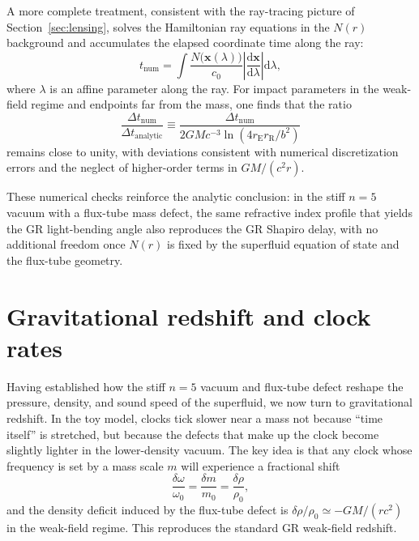 \documentclass[11pt]{article}
\begin{document}
A more complete treatment, consistent with the ray-tracing picture of
Section~\ref{sec:lensing}, solves the Hamiltonian ray equations in the
$N(r)$ background and accumulates the elapsed coordinate time along the
ray:
\begin{equation}
  t_\mathrm{num}
  = \int \frac{N\bigl(\mathbf{x}(\lambda)\bigr)}{c_0}
         \left|\frac{\mathrm{d}\mathbf{x}}{\mathrm{d}\lambda}\right|
         \mathrm{d}\lambda,
\end{equation}
where $\lambda$ is an affine parameter along the ray.
For impact parameters in the weak-field regime and endpoints far from the
mass, one finds that the ratio
\begin{equation}
  \frac{\Delta t_\mathrm{num}}
       {\Delta t_{\text{analytic}}}
  \equiv
  \frac{\Delta t_\mathrm{num}}
       {2GM c^{-3}
        \ln(4 r_\mathrm{E} r_\mathrm{R} / b^2)}
\end{equation}
remains close to unity, with deviations consistent with numerical
discretization errors and the neglect of higher-order terms in
$GM/(c^2 r)$.

These numerical checks reinforce the analytic conclusion: in the stiff
$n=5$ vacuum with a flux-tube mass defect, the same refractive index
profile that yields the GR light-bending angle also reproduces the GR
Shapiro delay, with no additional freedom once $N(r)$ is fixed by the
superfluid equation of state and the flux-tube geometry.

\section{Gravitational redshift and clock rates}
\label{sec:redshift}

Having established how the stiff $n=5$ vacuum and flux-tube defect reshape
the pressure, density, and sound speed of the superfluid, we now turn to
gravitational redshift.
In the toy model, clocks tick slower near a mass not because ``time itself''
is stretched, but because the defects that make up the clock become
slightly lighter in the lower-density vacuum.
The key idea is that any clock whose frequency is set by a mass scale $m$
will experience a fractional shift
\begin{equation}
  \frac{\delta\omega}{\omega_0}
  = \frac{\delta m}{m_0}
  = \frac{\delta\rho}{\rho_0},
\end{equation}
and the density deficit induced by the flux-tube defect is
$\delta\rho/\rho_0 \simeq -GM/(r c^2)$ in the weak-field regime.
This reproduces the standard GR weak-field redshift.
\end{document}
